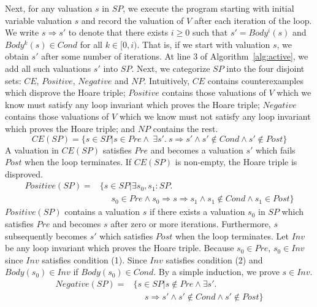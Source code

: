Next, for any valuation $s$ in $SP$, we execute the program starting with initial variable valuation $s$ and record the valuation of $V$ after each iteration of the loop. We write $s \Rightarrow s'$ to denote that there exists $i \geq 0$ such that $s' = Body^i(s)$ and $Body^k(s) \in Cond$ for all $k \in [0, i)$. That is, if we start with valuation $s$, we obtain $s'$ after some number of iterations. At line 3 of Algorithm~\ref{alg:active}, we add all such valuations $s'$ into $SP$. Next, we categorize $SP$ into the four disjoint sets: $CE$, $Positive$, $Negative$ and $NP$. Intuitively, $CE$ contains counterexamples which disprove the Hoare triple; $Positive$ contains those valuations of $V$ which we know must satisfy any loop invariant which proves the Hoare triple; $Negative$ contains those valuations of $V$ which we know must not satisfy any loop invariant which proves the Hoare triple; and $NP$ contains the rest. %
\[
CE(SP) = \{s \in SP |s \in Pre \land~\exists s'.~s \Rightarrow s' \land s' \not \in Cond \land s' \not \in Post\} \]
A valuation in $CE(SP)$ satisfies $Pre$ and becomes a valuation $s'$ which fails $Post$ when the loop terminates. If $CE(SP)$ is non-empty, the Hoare triple is disproved.
\begin{align*}
Positive(SP) = & \{s \in SP | \exists s_0,s_1: SP. \\
& ~~~~~~ s_0 \in Pre \land s_0 \Rightarrow s \Rightarrow s_1 \land s_1 \not \in Cond \land s_1 \in Post\}
\end{align*}
$Positive(SP)$ contains a valuation $s$ if there exists a valuation $s_0$ in $SP$ which satisfies $Pre$ and becomes $s$ after zero or more iterations. Furthermore, $s$ subsequently becomes $s'$ which satisfies $Post$ when the loop terminates. Let $Inv$ be any loop invariant which proves the Hoare triple. Because $s_0 \in Pre$, $s_0 \in Inv$ since $Inv$ satisfies condition (1). Since $Inv$ satisfies condition (2) and $Body(s_0) \in Inv$ if $Body(s_0) \in Cond$. By a simple induction, we prove $s \in Inv$.
\begin{align*}
    Negative(SP) = & \{s \in SP | s \not \in Pre \land \exists s'. \\
    & ~~~~~~s \Rightarrow s' \land s' \not \in Cond \land s' \not \in Post\}
\end{align*}
